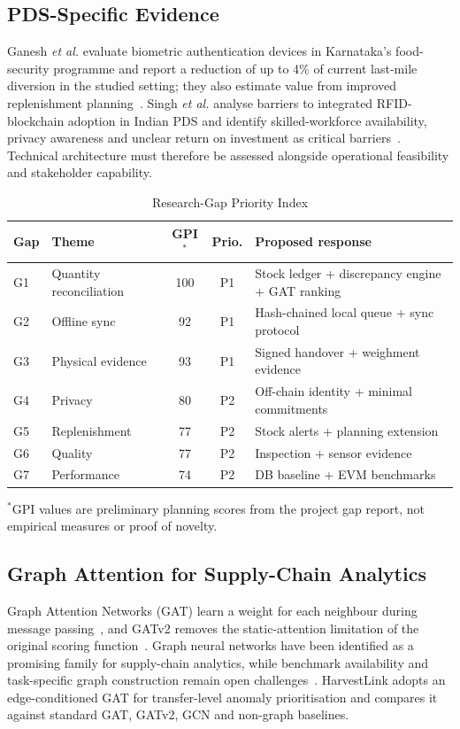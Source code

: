 \documentclass[conference,a4paper]{IEEEtran}
\begin{document}
\subsection{PDS-Specific Evidence}
Ganesh \textit{et al.} evaluate biometric authentication devices in Karnataka's food-security programme and report a reduction of up to 4\% of current last-mile diversion in the studied setting; they also estimate value from improved replenishment planning~\cite{ganesh2024}. Singh \textit{et al.} analyse barriers to integrated RFID-blockchain adoption in Indian PDS and identify skilled-workforce availability, privacy awareness and unclear return on investment as critical barriers~\cite{singh2024}. Technical architecture must therefore be assessed alongside operational feasibility and stakeholder capability.

\begin{table}[!t]
\caption{Research-Gap Priority Index}
\label{tab:gpi}
\centering\footnotesize
\begin{tabularx}{\columnwidth}{@{}l p{0.85in} c c X@{}}
\toprule
Gap & Theme & GPI$^{*}$ & Prio. & Proposed response\\
\midrule
G1 & Quantity reconciliation & 100 & P1 & Stock ledger + discrepancy engine + GAT ranking\\
G2 & Offline sync & 92 & P1 & Hash-chained local queue + sync protocol\\
G3 & Physical evidence & 93 & P1 & Signed handover + weighment evidence\\
G4 & Privacy & 80 & P2 & Off-chain identity + minimal commitments\\
G5 & Replenishment & 77 & P2 & Stock alerts + planning extension\\
G6 & Quality & 77 & P2 & Inspection + sensor evidence\\
G7 & Performance & 74 & P2 & DB baseline + EVM benchmarks\\
\bottomrule
\end{tabularx}

\vspace{2pt}\raggedright\scriptsize $^{*}$GPI values are preliminary planning scores from the project gap report, not empirical measures or proof of novelty.
\end{table}

\subsection{Graph Attention for Supply-Chain Analytics}
Graph Attention Networks (GAT) learn a weight for each neighbour during message passing~\cite{velickovic2018}, and GATv2 removes the static-attention limitation of the original scoring function~\cite{brody2022}. Graph neural networks have been identified as a promising family for supply-chain analytics, while benchmark availability and task-specific graph construction remain open challenges~\cite{wasi2024}. HarvestLink adopts an edge-conditioned GAT for transfer-level anomaly prioritisation and compares it against standard GAT, GATv2, GCN and non-graph baselines.
\end{document}
